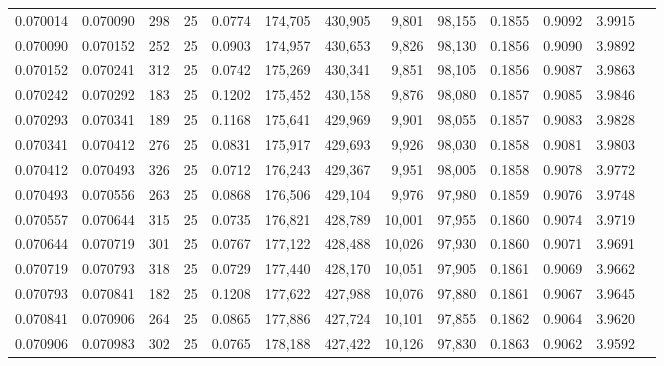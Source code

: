 \begin{tabular}{rrrrrrrrrrrrr}
0.070014 & 0.070090 &   298 &  25 &                                     0.0774 & 174,705 & 430,905 &   9,801 &  98,155 & 0.1855 & 0.9092 & 3.9915 \\
0.070090 & 0.070152 &   252 &  25 &                                     0.0903 & 174,957 & 430,653 &   9,826 &  98,130 & 0.1856 & 0.9090 & 3.9892 \\
0.070152 & 0.070241 &   312 &  25 &                                     0.0742 & 175,269 & 430,341 &   9,851 &  98,105 & 0.1856 & 0.9087 & 3.9863 \\
0.070242 & 0.070292 &   183 &  25 &                                     0.1202 & 175,452 & 430,158 &   9,876 &  98,080 & 0.1857 & 0.9085 & 3.9846 \\
0.070293 & 0.070341 &   189 &  25 &                                     0.1168 & 175,641 & 429,969 &   9,901 &  98,055 & 0.1857 & 0.9083 & 3.9828 \\
0.070341 & 0.070412 &   276 &  25 &                                     0.0831 & 175,917 & 429,693 &   9,926 &  98,030 & 0.1858 & 0.9081 & 3.9803 \\
0.070412 & 0.070493 &   326 &  25 &                                     0.0712 & 176,243 & 429,367 &   9,951 &  98,005 & 0.1858 & 0.9078 & 3.9772 \\
0.070493 & 0.070556 &   263 &  25 &                                     0.0868 & 176,506 & 429,104 &   9,976 &  97,980 & 0.1859 & 0.9076 & 3.9748 \\
0.070557 & 0.070644 &   315 &  25 &                                     0.0735 & 176,821 & 428,789 &  10,001 &  97,955 & 0.1860 & 0.9074 & 3.9719 \\
0.070644 & 0.070719 &   301 &  25 &                                     0.0767 & 177,122 & 428,488 &  10,026 &  97,930 & 0.1860 & 0.9071 & 3.9691 \\
0.070719 & 0.070793 &   318 &  25 &                                     0.0729 & 177,440 & 428,170 &  10,051 &  97,905 & 0.1861 & 0.9069 & 3.9662 \\
0.070793 & 0.070841 &   182 &  25 &                                     0.1208 & 177,622 & 427,988 &  10,076 &  97,880 & 0.1861 & 0.9067 & 3.9645 \\
0.070841 & 0.070906 &   264 &  25 &                                     0.0865 & 177,886 & 427,724 &  10,101 &  97,855 & 0.1862 & 0.9064 & 3.9620 \\
0.070906 & 0.070983 &   302 &  25 &                                     0.0765 & 178,188 & 427,422 &  10,126 &  97,830 & 0.1863 & 0.9062 & 3.9592 \\

\end{tabular}
